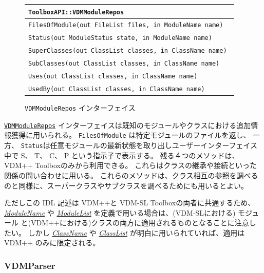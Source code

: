 \documentclass[\pformat,12pt]{jarticle}
\newcommand{\ModuleName}{\hyperlink{type.ModuleName}{ModuleName}}
\newcommand{\ModuleList}{\hyperlink{type.ModuleList}{ModuleList}}
\newcommand{\ClassName}{\hyperlink{type.ClassName}{ClassName}}
\newcommand{\ClassList}{\hyperlink{type.ClassList}{ClassList}}
\newcommand{\VDMModuleRepos}{\hyperlink{interface.VDMModuleRepos}{VDMModuleRepos}}
\begin{document}
\begin{figure}[tbh]
\begin{center}
\begin{tabular}{|l|}
\hline
{\tt ToolboxAPI::VDMModuleRepos } \\
\hline
{\tt FilesOfModule(out FileList files, in ModuleName name) } \\
{\tt Status(out ModuleStatus state, in ModuleName name) } \\
{\tt SuperClasses(out ClassList classes, in ClassName name) } \\
{\tt SubClasses(out ClassList classes, in ClassName name) } \\
{\tt Uses(out ClassList classes, in ClassName name) } \\
{\tt UsedBy(out ClassList classes, in ClassName name) } \\
\hline
\end{tabular}
\caption{{\tt VDMModuleRepos} インターフェイス}\label{fig:VDMModuleRepos}
\end{center}
\end{figure}

 {\tt \VDMModuleRepos} インターフェイスは既知のモジュールやクラスにおける追加情報獲得に用いられる。
{\tt FilesOfModule} は特定モジュールのファイルを返し、 一方、 {\tt Status}は任意モジュールの最新状態を取り出しユーザーインターフェイス中で S、 T、 C、 P という指示子で表示する。 
残る４つのメソッドは、VDM++ Toolboxのみから利用できる。
これらはクラスの継承や接続といった関係の問い合わせに用いる。
これらのメソッドは、クラス相互の参照を調べるのと同様に、スーパークラスやサブクラスを調べるためにも用いるとよい。

ただしこの IDL 記述は VDM++と VDM-SL Toolboxの両者に共通するため、 {\em \ModuleName} や {\em \ModuleList} を定義で用いる場合は、(VDM-SLにおける) モジュール と(VDM++における)クラスの両方に適用されるものとなることに注意したい。
しかし {\em \ClassName} や {\em \ClassList} が明白に用いられていれば、適用は VDM++ のみに限定される。

\subsubsection{VDMParser}

\end{document}
